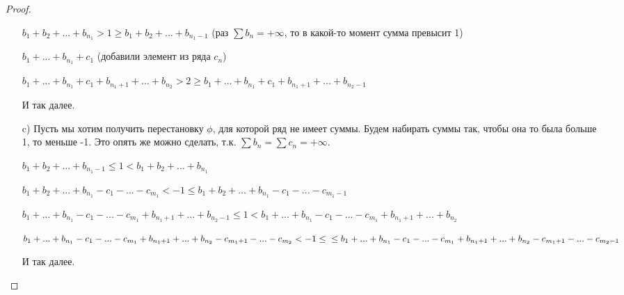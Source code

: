 \begin{proof}
\begin{enumerate}
	$b_1 + b_2 + ...+b_{n_1} > 1 \ge b_1+b_2+...+b_{n_1 - 1}$ (раз $\sum b_n = +\infty$, то в какой-то момент сумма превысит 1)
	
	$b_1 +...+b_{n_1} + c_1$ (добавили элемент из ряда $c_n$)
	
	$b_1 +...+b_{n_1} + c_1 + b_{n_1+1} + ...+b_{n_2 } > 2 \ge b_1 +...+b_{n_1} + c_1 + b_{n_1+1} + ...+b_{n_2 -1}$
	
	И так далее.
	
	\item[c)] Пусть мы хотим получить перестановку $\phi$, для которой ряд не имеет суммы. Будем набирать суммы так, чтобы она то была больше 1, то меньше -1. Это опять же можно сделать, т.к. $\sum b_n = \sum c_n = +\infty$.
	
	$b_1+b_2+...+b_{n_1 - 1} \le 1 < b_1 + b_2 + ... + b_{n_1}$ 
	
	$b_1+b_2+...+b_{n_1} -c_1-...-c_{m_1} < -1 \le b_1+b_2+...+b_{n_1}-c_1-...-c_{m_1 - 1}$
	
	$b_1+...+b_{n_1}-c_1-...-c_{m_1} + b_{n_1+1} + ...+b_{n_2 - 1} \le 1 < b_1+...+b_{n_1}-c_1-...-c_{m_1} + b_{n_1+1} + ...+b_{n_2}$
	
	$b_1+...+b_{n_1}-c_1-...-c_{m_1} + b_{n_1+1} + ...+b_{n_2} - c_{m_1+1}-...-c_{m_2} < -1 \le\\\le b_1+...+b_{n_1}-c_1-...-c_{m_1} + b_{n_1+1} + ...+b_{n_2}-c_{m_1+1}-...-c_{m_2-1}$
	
	И так далее.
	\end{enumerate}
\end{proof}